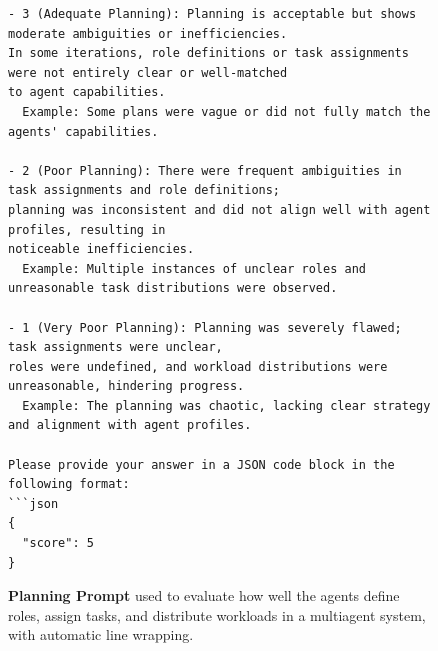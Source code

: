 \begin{figure}[htbp]
\begin{tcolorbox}
\begin{verbatim}
- 3 (Adequate Planning): Planning is acceptable but shows moderate ambiguities or inefficiencies. 
In some iterations, role definitions or task assignments were not entirely clear or well-matched 
to agent capabilities.
  Example: Some plans were vague or did not fully match the agents' capabilities.

- 2 (Poor Planning): There were frequent ambiguities in task assignments and role definitions; 
planning was inconsistent and did not align well with agent profiles, resulting in 
noticeable inefficiencies.
  Example: Multiple instances of unclear roles and unreasonable task distributions were observed.

- 1 (Very Poor Planning): Planning was severely flawed; task assignments were unclear, 
roles were undefined, and workload distributions were unreasonable, hindering progress.
  Example: The planning was chaotic, lacking clear strategy and alignment with agent profiles.

Please provide your answer in a JSON code block in the following format:
```json
{
  "score": 5
}
\end{verbatim}
\end{tcolorbox}

\caption{\textbf{Planning Prompt} used to evaluate how well the agents define roles, assign tasks, and distribute workloads in a multiagent system, with automatic line wrapping.}
\label{fig:planning_prompt}
\end{figure}


